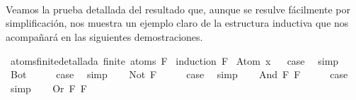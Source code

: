 \begin{isabellebody}
\begin{isamarkuptext}
\\
\\
\\%
\end{isamarkuptext}\isamarkuptrue%
%
\begin{isamarkuptext}%
Veamos la prueba detallada del resultado que, aunque se resulve 
fácilmente por simplificación, nos muestra un ejemplo claro de la estructura inductiva
que nos acompañará en las siguientes demostraciones.%
\end{isamarkuptext}\isamarkuptrue%
\isamarkupfalse%
\ atoms{\isacharunderscore}finite{\isacharunderscore}detallada{\isacharcolon}\ {\isachardoublequoteopen}finite\ {\isacharparenleft}atoms\ F{\isacharparenright}{\isachardoublequoteclose}\isanewline
%
\isadelimproof
%
\endisadelimproof
%
\isatagproof
{}\isamarkupfalse%
\ {\isacharparenleft}induction\ F{\isacharparenright}\isanewline
{}\isamarkupfalse%
\ {\isacharparenleft}Atom\ x{\isacharparenright}\isanewline
{}\isamarkupfalse%
\ \isamarkupfalse%
\ {\isacharquery}case\ \isamarkupfalse%
\ simp\isanewline
{}\isamarkupfalse%
\isanewline
{}\isamarkupfalse%
\ Bot\isanewline
\ \ \isamarkupfalse%
\ \isamarkupfalse%
\ {\isacharquery}case\ \isamarkupfalse%
\ simp\isanewline
{}\isamarkupfalse%
\isanewline
\ \ \isamarkupfalse%
\ {\isacharparenleft}Not\ F{\isacharparenright}\isanewline
\ \ \isamarkupfalse%
\ \isamarkupfalse%
\ {\isacharquery}case\ \isamarkupfalse%
\ simp\isanewline
{}\isamarkupfalse%
\isanewline
\ \ \isamarkupfalse%
\ {\isacharparenleft}And\ F{}\ F{}{\isacharparenright}\isanewline
\ \ \isamarkupfalse%
\ \isamarkupfalse%
\ {\isacharquery}case\ \isamarkupfalse%
\ simp\isanewline
{}\isamarkupfalse%
\isanewline
\ \ \isamarkupfalse%
\ {\isacharparenleft}Or\ F{}\ F{}{\isacharparenright}\isanewline

\end{isabellebody}
